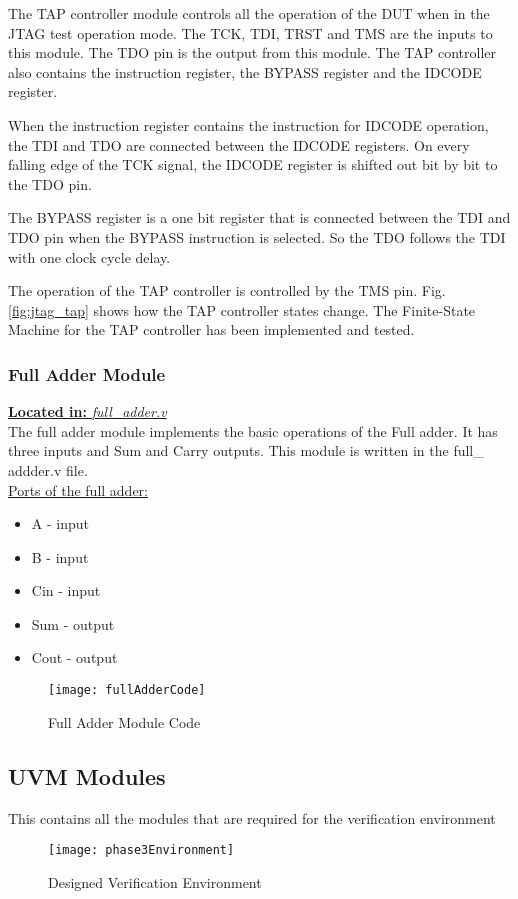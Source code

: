 \documentclass[a4paper,11pt]{article}
\begin{document}
The TAP controller module controls all the operation of the DUT when in the JTAG test operation mode. The TCK, TDI, TRST and TMS are the inputs to this module. The TDO pin is the output from this module. The TAP controller also contains the instruction register, the BYPASS register and the IDCODE register.

When the instruction register contains the instruction for IDCODE operation, the TDI and TDO are connected between the IDCODE registers. On every falling edge of the TCK signal, the IDCODE register is shifted out bit by bit to the TDO pin.

The BYPASS register is a one bit register that is connected between the TDI and TDO pin when the BYPASS instruction is selected. So the TDO follows the TDI with one clock cycle delay.

The operation of the TAP controller is controlled by the TMS pin. Fig. \ref{fig:jtag_tap} shows how the TAP controller states change. The Finite-State Machine for the TAP controller has been implemented and tested.


\FloatBarrier
\subsubsection{Full Adder Module}
\underline{\textbf{Located in:} \textit{full\_adder.v}}\\

The full adder module implements the basic operations of the Full adder. It has three inputs and Sum and Carry outputs. This module is written in the full\_ addder.v file.\\

\underline{Ports of the full adder:}
\begin{itemize}[noitemsep]
\item A - input
\item B - input
\item Cin - input
\item Sum - output
\item Cout - output
\end{itemize}

\begin{figure}[ht]
\centering
\texttt{[image: fullAdderCode]}
\caption{Full Adder Module Code}
\end{figure}

\FloatBarrier
\subsection{UVM Modules}
This contains all the modules that are required for the verification environment
\begin{figure}[ht]
\centering
\texttt{[image: phase3Environment]}
\caption{Designed Verification Environment}
\end{figure}
\end{document}
